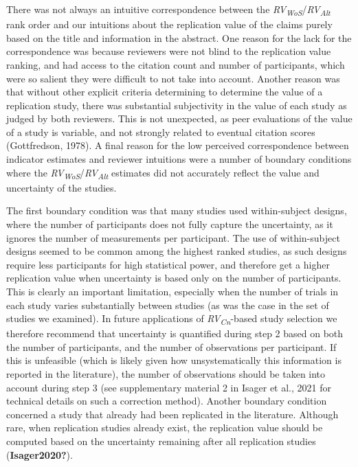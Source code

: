 \documentclass[
  man,floatsintext]{apa6}
\begin{document}
There was not always an intuitive correspondence between the \emph{RV\textsubscript{WoS}}/\emph{RV\textsubscript{Alt}} rank order and our intuitions about the replication value of the claims purely based on the title and information in the abstract. One reason for the lack for the correspondence was because reviewers were not blind to the replication value ranking, and had access to the citation count and number of participants, which were so salient they were difficult to not take into account. Another reason was that without other explicit criteria determining to determine the value of a replication study, there was substantial subjectivity in the value of each study as judged by both reviewers. This is not unexpected, as peer evaluations of the value of a study is variable, and not strongly related to eventual citation scores (Gottfredson, 1978). A final reason for the low perceived correspondence between indicator estimates and reviewer intuitions were a number of boundary conditions where the \emph{RV\textsubscript{WoS}}/\emph{RV\textsubscript{Alt}} estimates did not accurately reflect the value and uncertainty of the studies.

The first boundary condition was that many studies used within-subject designs, where the number of participants does not fully capture the uncertainty, as it ignores the number of measurements per participant. The use of within-subject designs seemed to be common among the highest ranked studies, as such designs require less participants for high statistical power, and therefore get a higher replication value when uncertainty is based only on the number of participants. This is clearly an important limitation, especially when the number of trials in each study varies substantially between studies (as was the case in the set of studies we examined). In future applications of \emph{RV\textsubscript{Cn}}-based study selection we therefore recommend that uncertainty is quantified during step 2 based on both the number of participants, and the number of observations per participant. If this is unfeasible (which is likely given how unsystematically this information is reported in the literature), the number of observations should be taken into account during step 3 (see supplementary material 2 in Isager et al., 2021 for technical details on such a correction method). Another boundary condition concerned a study that already had been replicated in the literature. Although rare, when replication studies already exist, the replication value should be computed based on the uncertainty remaining after all replication studies (\textbf{Isager2020?}).
\end{document}
